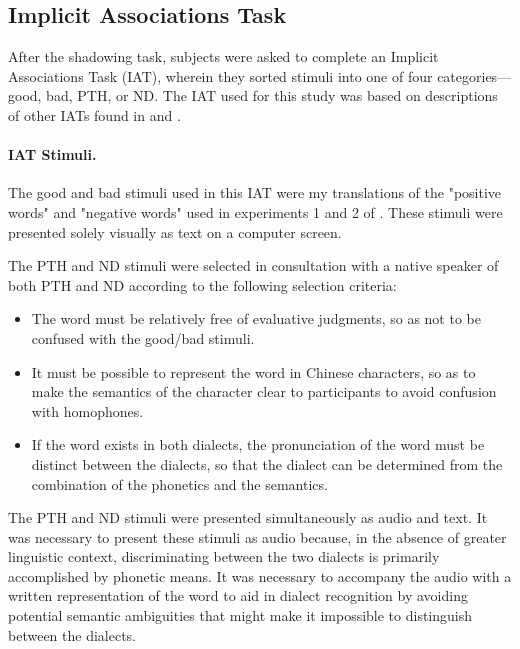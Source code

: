\subsection{Implicit Associations Task}
\label{ssec:procedureIAT}
After the shadowing task, subjects were asked to complete an Implicit Associations Task (IAT), wherein they sorted stimuli into one of four categories---good, bad, PTH, or ND. The IAT used for this study was based on descriptions of other IATs found in \cite{greenwald1998measuring} and \cite{greenwald2003understanding}.

\paragraph{IAT Stimuli.}
\label{para:IATstims}
The good and bad stimuli used in this IAT were my translations of the "positive words" and "negative words" used in experiments 1 and 2 of \cite{greenwald1998measuring}. These stimuli were presented solely visually as text on a computer screen.

The PTH and ND stimuli were selected in consultation with a native speaker of both PTH and ND according to the following selection criteria:
\begin{itemize}
\item The word must be relatively free of evaluative judgments, so as not to be confused with the good/bad stimuli.
\item It must be possible to represent the word in Chinese characters, so as to make the semantics of the character clear to participants to avoid confusion with homophones.
\item If the word exists in both dialects, the pronunciation of the word must be distinct between the dialects, so that the dialect can be determined from the combination of the phonetics and the semantics.
\end{itemize}
The PTH and ND stimuli were presented simultaneously as audio and text. It was necessary to present these stimuli as audio because, in the absence of greater linguistic context, discriminating between the two dialects is primarily accomplished by phonetic means. It was necessary to accompany the audio with a written representation of the word to aid in dialect recognition by avoiding potential semantic ambiguities that might make it impossible to distinguish between the dialects. 

